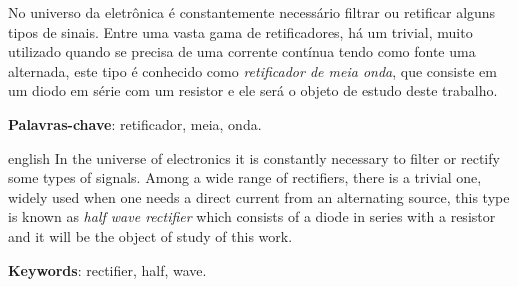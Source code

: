 \documentclass[
	12pt,				%
	openright,			%
	twoside,			%
	a4paper,			%
	article,	
	english,			%
	french,				%
	spanish,			%
	brazil				%
	]{abntex2}
\begin{document}

\frenchspacing 


\imprimircapa

\imprimirfolhaderosto*


\setlength{\absparsep}{18pt} %
\begin{resumo}
 No universo da eletrônica é constantemente necessário filtrar ou retificar alguns tipos de sinais. Entre uma vasta gama de retificadores, há um trivial, muito utilizado quando se precisa de uma corrente contínua tendo como fonte uma alternada, este tipo é conhecido como \emph{retificador de meia onda}, que consiste em um diodo em série com um resistor e ele será o objeto de estudo deste trabalho.

 \textbf{Palavras-chave}: retificador, meia, onda.
\end{resumo}
\newpage
\begin{resumo}[Abstract]
 \begin{otherlanguage*}{english}
   In the universe of electronics it is constantly necessary to filter or rectify some types of signals. Among a wide range of rectifiers, there is a trivial one, widely used when one needs a direct current from an alternating source, this type is known as \emph {half wave rectifier} which consists of a diode in series with a resistor and it will be the object of study of this work.

   \vspace{\onelineskip}
 
   \noindent 
   \textbf{Keywords}: rectifier, half, wave.
 \end{otherlanguage*}
\end{resumo}


\newpage
\newpage
\tableofcontents*
\cleardoublepage
\end{document}
